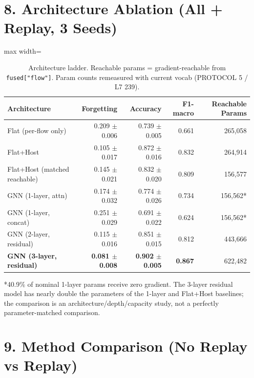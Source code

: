 \documentclass[11pt,a4paper]{article}
\begin{document}
\section*{8. Architecture Ablation (All + Replay, 3 Seeds)}

\begin{table}[H]
\centering
\caption{Architecture ladder. Reachable params = gradient-reachable from \texttt{fused["flow"]}. Param counts remeasured with current vocab (PROTOCOL 5 / L7 239).}
\label{tab:arch-ablation}
\begin{adjustbox}{max width=\textwidth}
\begin{tabular}{lrrrr}
\toprule
Architecture & Forgetting & Accuracy & F1-macro & Reachable Params \\
\midrule
Flat (per-flow only) & 0.209 $\pm$ 0.006 & 0.739 $\pm$ 0.005 & 0.661 & 265,058 \\
Flat+Host & 0.105 $\pm$ 0.017 & 0.872 $\pm$ 0.016 & 0.832 & 264,914 \\
Flat+Host (matched reachable) & 0.145 $\pm$ 0.021 & 0.832 $\pm$ 0.020 & 0.809 & 156,577 \\
GNN (1-layer, attn) & 0.174 $\pm$ 0.032 & 0.774 $\pm$ 0.026 & 0.734 & 156,562* \\
GNN (1-layer, concat) & 0.251 $\pm$ 0.029 & 0.691 $\pm$ 0.022 & 0.624 & 156,562* \\
GNN (2-layer, residual) & 0.115 $\pm$ 0.016 & 0.851 $\pm$ 0.015 & 0.812 & 443,666 \\
\textbf{GNN (3-layer, residual)} & \textbf{0.081 $\pm$ 0.008} & \textbf{0.902 $\pm$ 0.005} & \textbf{0.867} & 622,482 \\
\bottomrule
\end{tabular}
\end{adjustbox}
\end{table}
*40.9\% of nominal 1-layer params receive zero gradient. The 3-layer residual model has nearly double the parameters of the 1-layer and Flat+Host baselines; the comparison is an architecture/depth/capacity study, not a perfectly parameter-matched comparison.

\section*{9. Method Comparison (No Replay vs Replay)}
\end{document}
